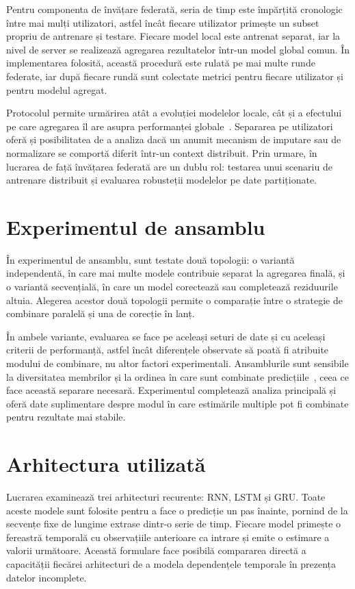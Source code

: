 Pentru componenta de învățare federată, seria de timp este împărțită cronologic între mai mulți utilizatori, astfel încât fiecare utilizator primește un subset propriu de antrenare și testare. Fiecare model local este antrenat separat, iar la nivel de server se realizează agregarea rezultatelor într-un model global comun. În implementarea folosită, această procedură este rulată pe mai multe runde federate, iar după fiecare rundă sunt colectate metrici pentru fiecare utilizator și pentru modelul agregat.

Protocolul permite urmărirea atât a evoluției modelelor locale, cât și a efectului pe care agregarea îl are asupra performanței globale~\cite{mcmahan2017fedavg, kairouz2021fl}. Separarea pe utilizatori oferă și posibilitatea de a analiza dacă un anumit mecanism de imputare sau de normalizare se comportă diferit într-un context distribuit. Prin urmare, în lucrarea de față învățarea federată are un dublu rol: testarea unui scenariu de antrenare distribuit și evaluarea robusteții modelelor pe date partiționate.

\section{Experimentul de ansamblu}

În experimentul de ansamblu, sunt testate două topologii: o variantă independentă, în care mai multe modele contribuie separat la agregarea finală, și o variantă secvențială, în care un model corectează sau completează reziduurile altuia. Alegerea acestor două topologii permite o comparație între o strategie de combinare paralelă și una de corecție în lanț.

În ambele variante, evaluarea se face pe aceleași seturi de date și cu aceleași criterii de performanță, astfel încât diferențele observate să poată fi atribuite modului de combinare, nu altor factori experimentali. Ansamblurile sunt sensibile la diversitatea membrilor și la ordinea în care sunt combinate predicțiile~\cite{dietterich2000ensemble, zhou2012ensemble}, ceea ce face această separare necesară. Experimentul completează analiza principală și oferă date suplimentare despre modul în care estimările multiple pot fi combinate pentru rezultate mai stabile.

\section{Arhitectura utilizată}

Lucrarea examinează trei arhitecturi recurente: RNN, LSTM și GRU. Toate aceste modele sunt folosite pentru a face o predicție un pas înainte, pornind de la secvențe fixe de lungime extrase dintr-o serie de timp. Fiecare model primește o fereastră temporală cu observațiile anterioare ca intrare și emite o estimare a valorii următoare. Această formulare face posibilă compararea directă a capacității fiecărei arhitecturi de a modela dependențele temporale în prezența datelor incomplete.

